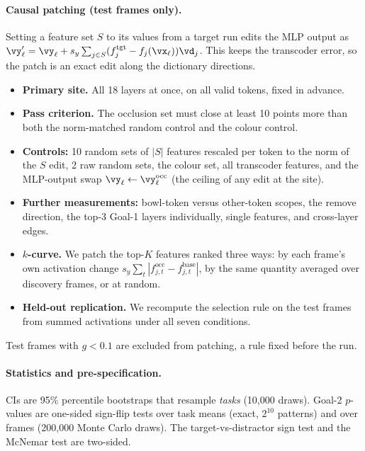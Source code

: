 \documentclass{article} %
\begin{document}
\paragraph{Causal patching (test frames only).} Setting a feature set $S$ to its values from a target run edits the MLP output as $\vy'_\ell=\vy_\ell+s_y\sum_{j\in S}(f^{\text{tgt}}_j-f_j(\vx_\ell))\vd_j$. This keeps the transcoder error, so the patch is an exact edit along the dictionary directions.
\begin{itemize}[leftmargin=*,itemsep=1pt,topsep=2pt]
  \item \textbf{Primary site.} All 18 layers at once, on all valid tokens, fixed in advance.
  \item \textbf{Pass criterion.} The occlusion set must close at least 10 points more than both the norm-matched random control and the colour control.
  \item \textbf{Controls:} 10 random sets of $|S|$ features rescaled per token to the norm of the $S$ edit, 2 raw random sets, the colour set, all transcoder features, and the MLP-output swap $\vy_\ell\leftarrow\vy^{\text{occ}}_\ell$ (the ceiling of any edit at the site).
  \item \textbf{Further measurements:} bowl-token versus other-token scopes, the remove direction, the top-3 Goal-1 layers individually, single features, and cross-layer edges.
  \item \textbf{$k$-curve.} We patch the top-$K$ features ranked three ways: by each frame's own activation change $s_y\sum_t|f^{\text{occ}}_{j,t}-f^{\text{base}}_{j,t}|$, by the same quantity averaged over discovery frames, or at random.
  \item \textbf{Held-out replication.} We recompute the selection rule on the test frames from summed activations under all seven conditions.
\end{itemize}
Test frames with $g<0.1$ are excluded from patching, a rule fixed before the run.

\paragraph{Statistics and pre-specification.} CIs are 95\% percentile bootstraps that resample \emph{tasks} (10,000 draws). Goal-2 $p$-values are one-sided sign-flip tests over task means (exact, $2^{10}$ patterns) and over frames (200,000 Monte Carlo draws). The target-vs-distractor sign test and the McNemar test are two-sided.
\end{document}
